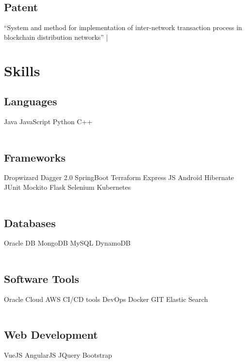 \documentclass[]{resume-openfont}
\begin{document}
\begin{minipage}[t]{0.33\textwidth}
\subsection{Patent}
“System and method for implementation of inter-network transaction process in blockchain distribution networks”  | \href{https://patentscope.wipo.int/search/en/detail.jsf?docId=IN326376132}{\faLink}



\section{Skills}
\subsection{Languages}
Java \textbullet{}   JavaScript \textbullet{} Python \textbullet{} C++ \\~\\
\subsection{Frameworks}
Dropwizard \textbullet{} Dagger 2.0 \textbullet{} SpringBoot \textbullet{} Terraform \textbullet{} Express JS \textbullet{} Android \textbullet{} Hibernate \textbullet{} JUnit \textbullet{} Mockito \textbullet{} Flask \textbullet{} Selenium \textbullet{} Kubernetes\\~\\
\subsection{Databases}
Oracle DB \textbullet{} MongoDB \textbullet{} MySQL \textbullet{} DynamoDB \\~\\
\subsection{Software Tools}
Oracle Cloud \textbullet{} AWS \textbullet{} CI/CD tools \textbullet{} DevOps \textbullet{} Docker \textbullet{} GIT \textbullet{} Elastic Search \\~\\
\subsection{Web Development}
VueJS \textbullet{}  AngularJS \textbullet{} JQuery \textbullet{} Bootstrap \\~\\

%
%

\end{minipage}
\end{document}
